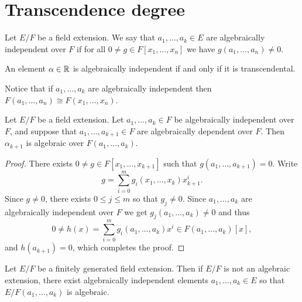 \documentclass[11pt,a4paper]{article}
\begin{document}
\newpage

\section{Transcendence degree}
\begin{definition}
  Let $E/F$ be a field extension.
  We say that $a_1,\dots,a_k \in E$ are algebraically
  independent over $F$ if for all $0 \neq g \in F[x_1,\dots,x_n]$
  we have $g(a_1,\dots,a_n) \neq 0$.
\end{definition}

\begin{example}
  An element $\alpha \in \mathbb{R}$ is algebraically independent if and only if
  it is transcendental.
\end{example}

\begin{remark}
  Notice that if $a_1,\dots,a_k$ are algebraically independent
  then $F(a_1,\dots,a_n) \cong F(x_1,\dots,x_n)$.
\end{remark}

\begin{lemma}
  \label{lem:for-steinz}
  Let $E/F$ be a field extension.
  Let $a_1,\dots,a_{k} \in F$ be algebraically independent over $F$, and
  suppose that $a_1,\dots,a_{k+1} \in F$ are algebraically dependent over $F$.
  Then $\alpha_{k+1}$ is algebraic over $F(a_1,\dots,a_k)$.
\end{lemma}
\begin{proof}
  There exists $0 \neq g \in F[x_1,\dots,x_{k+1}]$
  such that $g(a_1,\dots,a_{k+1}) = 0$.
  Write
  \[
    g = \sum_{i=0}^{m} g_i(x_1,\dots,x_k) x^i_{k+1}.
  \]
  Since $g \neq 0$,
  there exists $0 \le j \le m$ so that $g_j \neq 0$.
  Since $a_1,\dots,a_k$ are algebraically independent over $F$
  we get $g_j(a_1,\dots,a_k) \neq 0$
  and thus
  \[
    0 \neq h(x) =
    \sum_{i=0}^{m} g_i(a_1,\dots,a_k) x^i \in
    F(a_1,\dots,a_k)[x],
  \]
  and $h(a_{k+1}) = 0$,
  which completes the proof.
\end{proof}

\begin{corollary}
  Let $E/F$ be a finitely generated field extension.
  Then if $E/F$ is not an algebraic extension,
  there exist algebraically independent elements $a_1,\dots,a_k \in E$
  so that $E/F(a_1,\dots,a_k)$ is algebraic.
\end{corollary}
\end{document}

